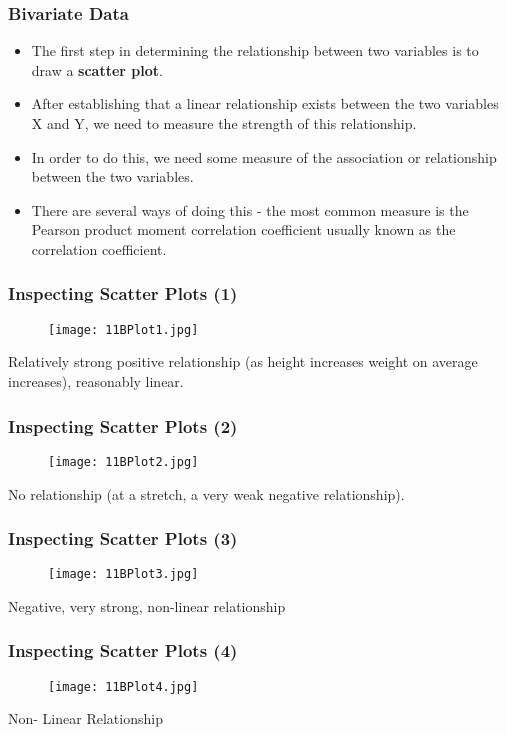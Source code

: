 \documentclass[a4]{beamer}
\begin{document}
\begin{frame}
\frametitle{Bivariate Data}
\begin{itemize}
\item The first step in determining the relationship between two
variables is to draw a \textbf{scatter plot}.
\item After establishing that a linear relationship exists between the
two variables X and Y, we need to measure the strength of this
relationship.
\item In order to do this, we need some measure of the association
or relationship between the two variables.
\item There are several ways of doing this - the most common
measure is the Pearson product moment correlation
coefficient usually known as the correlation coefficient.

\end{itemize}	
\end{frame}

\begin{frame}
\frametitle{Inspecting Scatter Plots (1) }
\begin{figure}
  \texttt{[image: 11BPlot1.jpg]}\\
\end{figure}
Relatively strong positive relationship (as height increases
weight on average increases), reasonably linear.

\end{frame}
\begin{frame}
\frametitle{Inspecting Scatter Plots (2) }
\begin{figure}
  \texttt{[image: 11BPlot2.jpg]}\\
\end{figure}

No relationship (at a stretch, a very weak negative relationship).
\end{frame}
\begin{frame}
\frametitle{Inspecting Scatter Plots (3) }
\begin{figure}
  \texttt{[image: 11BPlot3.jpg]}\\

\end{figure}

Negative, very strong, non-linear relationship
\end{frame}

\begin{frame}
\frametitle{Inspecting Scatter Plots (4) }
\begin{figure}
  \texttt{[image: 11BPlot4.jpg]}\\
\end{figure}
Non- Linear Relationship
\end{frame}
\end{document}
